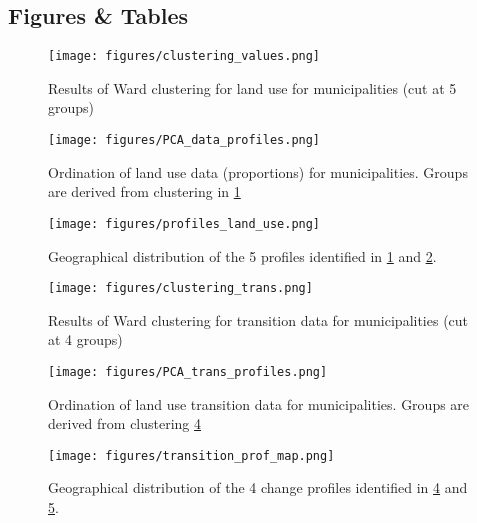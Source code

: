 \newpage
\begin{center}
\section*{Figures \& Tables}
\end{center}

\begin{figure}[h!]
  \centering
    \texttt{[image: figures/clustering\_values.png]}
  \caption{Results of Ward clustering for land use for municipalities (cut at 5 groups)}
  \label{fig:clustervals}
\end{figure}

\begin{figure}[h!]
  \centering
    \texttt{[image: figures/PCA\_data\_profiles.png]}
  \caption{Ordination of land use data (proportions) for municipalities. Groups are derived from clustering in \ref{fig:clustervals}}
  \label{fig:PCAvals}
\end{figure}

\begin{figure}[h!]
  \centering
    \texttt{[image: figures/profiles\_land\_use.png]}
  \caption{Geographical distribution of the 5 profiles identified in \ref{fig:clustervals} and \ref{fig:PCAvals}.}
  \label{fig:mapvals}
\end{figure}

\begin{figure}[h!]
  \centering
    \texttt{[image: figures/clustering\_trans.png]}
  \caption{Results of Ward clustering for transition data for municipalities (cut at 4 groups)}
  \label{fig:clustertrans}
\end{figure}

\begin{figure}[h!]
  \centering
    \texttt{[image: figures/PCA\_trans\_profiles.png]}
  \caption{Ordination of land use transition data for municipalities. Groups are derived from clustering \ref{fig:clustertrans}}
  \label{fig:PCAtrans}
\end{figure}

\begin{figure}[h!]
  \centering
    \texttt{[image: figures/transition\_prof\_map.png]}
  \caption{Geographical distribution of the 4 change profiles identified in \ref{fig:clustertrans} and \ref{fig:PCAtrans}.}
  \label{fig:maptrans}
\end{figure}

